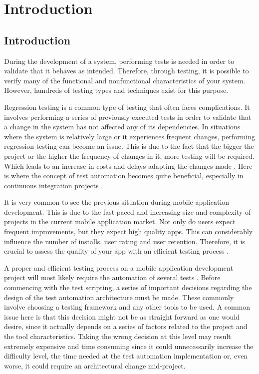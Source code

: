 %
\chapter{Introduction}
\label{sec:intro}

\section{Introduction}

During the development of a system, performing tests is needed in order to validate that it behaves as intended. Therefore, through testing, it is possible to verify many of the functional and nonfunctional characteristics of your system. However, hundreds of testing types and techniques exist for this purpose.

Regression testing is a common type of testing that often faces complications. It involves performing a series of previously executed tests in order to validate that a change in the system has not affected any of its dependencies. In situations where the system is relatively large or it experiences frequent changes, performing regression testing can become an issue. This is due to the fact that the bigger the project or the higher the frequency of changes in it, more testing will be required. Which leads to an increase in costs and delays adapting the changes made \cite{Google Automate UI tests}. Here is where the concept of test automation becomes quite beneficial, especially in continuous integration projects \cite{ISTQB}.

It is very common to see the previous situation during mobile application development. This is due to the fast-paced and increasing size and complexity of projects in the current mobile application market. Not only do users expect frequent improvements, but they expect high quality apps. This can considerably influence the number of installs, user rating and user retention. Therefore, it is crucial to assess the quality of your app with an efficient testing process \cite{Google App Quality}.

A proper and efficient testing process on a mobile application development project will most likely require the automation of several tests \cite{Gaurav Why Test Automation}. Before commencing with the test scripting, a series of important decisions regarding the design of the test automation architecture must be made. These commonly involve choosing a testing framework and any other tools to be used. A common issue here is that this decision might not be as straight forward as one would desire, since it actually depends on a series of factors related to the project and the tool characteristics. Taking the wrong decision at this level may result extremely expensive and time consuming since it could unnecessarily increase the difficulty level, the time needed at the test automation implementation or, even worse, it could require an architectural change mid-project.


